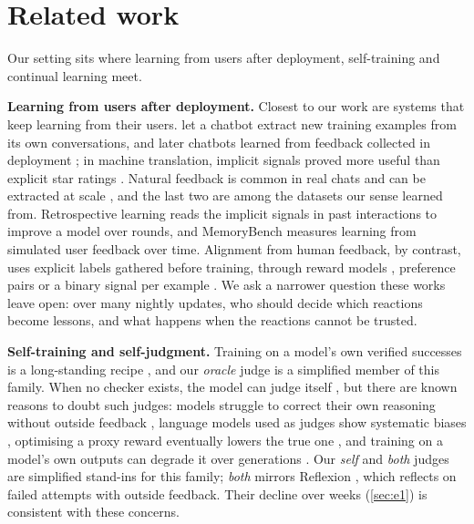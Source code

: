 \section{Related work}

Our setting sits where learning from users after deployment, self-training and continual learning meet.

\textbf{Learning from users after deployment.} Closest to our work are systems that keep learning from their users. \citet{hancock2019learning} let a chatbot extract new training examples from its own conversations, and later chatbots learned from feedback collected in deployment \cite{xu2023learning}; in machine translation, implicit signals proved more useful than explicit star ratings \cite{kreutzer2018can}. Natural feedback is common in real chats and can be extracted at scale \cite{doneyehiya2024naturally, shi2026wildfeedback, peng2026wildreward}, and the last two are among the datasets our sense learned from. Retrospective learning \cite{chen2025retrospective} reads the implicit signals in past interactions to improve a model over rounds, and MemoryBench \cite{ai2026memorybench} measures learning from simulated user feedback over time. Alignment from human feedback, by contrast, uses explicit labels gathered before training, through reward models \cite{christiano2017deep, ouyang2022training}, preference pairs \cite{rafailov2023dpo} or a binary signal per example \cite{ethayarajh2024model}. We ask a narrower question these works leave open: over many nightly updates, who should decide which reactions become lessons, and what happens when the reactions cannot be trusted.

\textbf{Self-training and self-judgment.} Training on a model's own verified successes is a long-standing recipe \cite{zelikman2022star, yuan2023scaling, gulcehre2023reinforced, singh2024beyond}, and our \emph{oracle} judge is a simplified member of this family. When no checker exists, the model can judge itself \cite{yuan2024selfrewarding, wu2025meta}, but there are known reasons to doubt such judges: models struggle to correct their own reasoning without outside feedback \cite{huang2024large}, language models used as judges show systematic biases \cite{zheng2023judging}, optimising a proxy reward eventually lowers the true one \cite{gao2023scaling}, and training on a model's own outputs can degrade it over generations \cite{shumailov2024ai}. Our \emph{self} and \emph{both} judges are simplified stand-ins for this family; \emph{both} mirrors Reflexion \cite{shinn2023reflexion}, which reflects on failed attempts with outside feedback. Their decline over weeks (\ref{sec:e1}) is consistent with these concerns.


